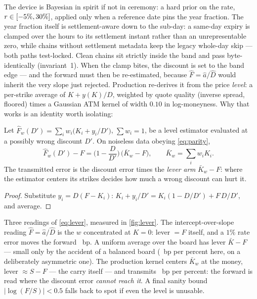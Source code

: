 \documentclass[11pt]{article}
\begin{document}
The device is Bayesian in spirit if not in ceremony: a hard prior on the
rate, $r\in[-5\%,30\%]$, applied only when a reference
date pins the year fraction.  The year fraction itself is settlement-aware
down to the sub-day: a same-day expiry is clamped over the hours to its
settlement instant rather than an unrepresentable zero, while chains
without settlement metadata keep the legacy whole-day skip --- both paths
test-locked.  Clean chains sit strictly inside the band
and pass byte-identically (invariant~1).  When the clamp bites, the
discount is set to the band edge --- and the forward must then be
re-estimated, because $\hat F=\hat a/\hat D$ would inherit the very slope
just rejected.  Production re-derives it from the price \emph{level}: a
per-strike average of $K+y(K)/D$, weighted by quote quality (inverse
spread, floored) times a Gaussian ATM kernel of width $0.10$ in
log-moneyness.  Why that works is an identity worth isolating:

\begin{proposition}
\label{prop:lever}
Let $\hat F_w(D')=\sum_iw_i\big(K_i+y_i/D'\big)$, $\sum w_i=1$, be a
level estimator evaluated at a possibly wrong discount $D'$.  On
noiseless data obeying \eqref{eq:parity},
\begin{equation}
\hat F_w(D')-F=\Big(1-\frac{D}{D'}\Big)\,\big(\bar K_w-F\big),
\qquad \bar K_w=\sum_iw_iK_i .
\label{eq:lever}
\end{equation}
The transmitted error is the discount error times the \emph{lever arm}
$\bar K_w-F$: where the estimator centers its strikes decides how much a
wrong discount can hurt it.
\end{proposition}

\begin{proof}
Substitute $y_i=D(F-K_i)$:
$K_i+y_i/D'=K_i(1-D/D')+F\,D/D'$, and average.
\end{proof}

Three readings of \eqref{eq:lever}, measured in \cref{fig:lever}.  The
intercept-over-slope reading $\hat F=\hat a/\hat D$ is the $w$
concentrated at $K=0$: lever $=F$ itself, and a $1\%$ rate error moves the
forward \fwdinflevernaive\ bp.  A uniform average over the board has lever
$\bar K-F$ --- small only by the accident of a balanced board
(\fwdinfleverunif\ bp per percent here, on a deliberately asymmetric one).
The production kernel centers $\bar K_w$ at the money, lever
$\approx S-F$ --- the carry itself --- and transmits
\fwdinfleverkern\ bp per percent: the forward is read where the discount
error \emph{cannot reach it}.  A final sanity bound
$|\log(F/S)|<0.5$ falls back to spot if even the level is unusable.
\end{document}
